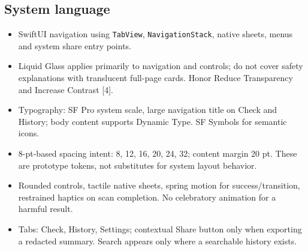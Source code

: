 \documentclass[10pt,a4paper]{article}
\begin{document}
\subsection{System language}
\begin{itemize}
\item SwiftUI navigation using \texttt{TabView}, \texttt{NavigationStack}, native sheets, menus and system share entry points.
\item Liquid Glass applies primarily to navigation and controls; do not cover safety explanations with translucent full-page cards. Honor Reduce Transparency and Increase Contrast [4].
\item Typography: SF Pro system scale, large navigation title on Check and History; body content supports Dynamic Type. SF Symbols for semantic icons.
\item 8-pt-based spacing intent: 8, 12, 16, 20, 24, 32; content margin 20 pt. These are prototype tokens, not substitutes for system layout behavior.
\item Rounded controls, tactile native sheets, spring motion for success/transition, restrained haptics on scan completion. No celebratory animation for a harmful result.
\item Tabs: Check, History, Settings; contextual Share button only when exporting a redacted summary. Search appears only where a searchable history exists.
\end{itemize}
\end{document}
